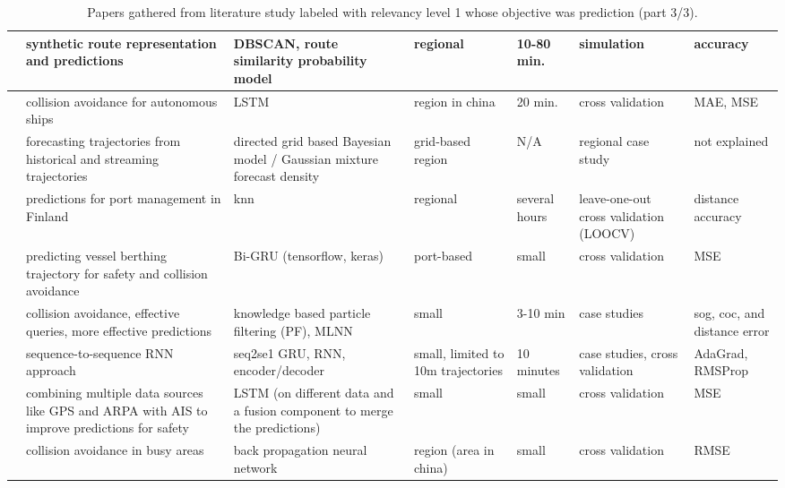 \noindent
\begin{table}[htbp]
{\small\begin{tabularx}{1.2\textwidth}{p{0.6in} X X X p{0.4in} X p{0.5in}}
    \midrule
    \cite{Tafa2019AutomaticPrediction} & synthetic route representation and predictions & DBSCAN, route similarity probability model & regional & 10-80 min. & simulation & accuracy \\ \midrule
    \cite{Tang2019ANetwork} & collision avoidance for autonomous ships & LSTM & region in china & 20 min. & cross validation & MAE, MSE \\ \midrule
    \cite{Uney2019DataModels} & forecasting trajectories from historical and streaming trajectories & directed grid based Bayesian model / Gaussian mixture forecast density & grid-based region & N/A & regional case study & not explained \\ \midrule
    \cite{Virjonen2018ShipMethod} & predictions for port management in Finland & \acrshort{knn} & regional & several hours & leave-one-out cross validation (LOOCV) & distance accuracy \\ \midrule
    \cite{Wang2020VesselGRU} & predicting vessel berthing trajectory for safety and collision avoidance & Bi-GRU (tensorflow, keras) & port-based & small & cross validation & MSE \\ \midrule
    \cite{Xiao2020BigTechniques} & collision avoidance, effective queries, more effective predictions & knowledge based particle filtering (PF), MLNN & small & 3-10 min & case studies & sog, coc, and distance error \\ \midrule
    \cite{You2020ST-Seq2Seq:Prediction} & sequence-to-sequence RNN approach & seq2se1 GRU, RNN, encoder/decoder & small, limited to 10m trajectories & 10 minutes & case studies, cross validation & AdaGrad, RMSProp \\ \midrule
    \cite{Zheng2020HeterogenousModeling} & combining multiple data sources like GPS and ARPA with AIS to improve predictions for safety & LSTM (on different data and a fusion component to merge the predictions) & small & small & cross validation & MSE \\ \midrule
    \cite{Zhou2019ShipNetwork} & collision avoidance in busy areas & back propagation neural network & region (area in china) & small & cross validation & RMSE \\
    \bottomrule
\end{tabularx}}
\caption{Papers gathered from literature study labeled with relevancy level 1 whose objective was prediction (part 3/3).}
\label{tab:less_relevant_papers}
\label{tab:lit_review_cat_1_3}
\end{table}
